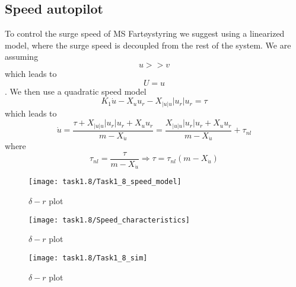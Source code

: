 
\subsection{Speed autopilot}\label{sec:prob1.2}
To control the surge speed of MS Fartøystyring we suggest using a linearized model, where the surge speed is decoupled from the rest of the system. We are assuming $$u>>v$$ which leads to $$U=u$$.
We then use a quadratic speed model
\begin{equation}
K_1 \dot{u} - X_u u_r - X_{|u| u} |u_r| u_r=\tau
\end{equation}
which leads to
\begin{equation}
\dot{u} = \frac{ \tau + X_{|u|u} |u_r| u_r +X_u u_r }{ m-X_{\dot{u}} } 
= \frac{X_{|u|u} |u_r| u_r +X_u u_r }{ m-X_{\dot{u}} } + \tau_{nl}
\end{equation}
where
\begin{equation}
\tau_{nl}  = \frac{ \tau}{ m-X_{\dot{u}} } \Rightarrow \tau = \tau_{nl}(m-X_{\dot{u}})
\end{equation}

\begin{figure}[h!]
    \centering
    \texttt{[image: task1.8/Task1\_8\_speed\_model]}
    \caption{$\delta - r$ plot}
    \label{fig:speed_model}
\end{figure}

\begin{figure}[h!]
    \centering
    \texttt{[image: task1.8/Speed\_characteristics]}
    \caption{$\delta - r$ plot}
    \label{fig:nc-u-plot}
\end{figure}

\begin{figure}[h!]
    \centering
    \texttt{[image: task1.8/Task1\_8\_sim]}
    \caption{$\delta - r$ plot}
    \label{fig:task1_8}
\end{figure}